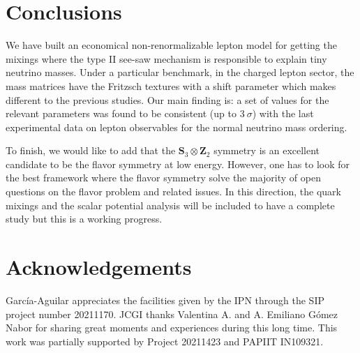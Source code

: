 \documentclass[aps,prd,groupaddress,floatfix,tighten,nofootinbib,showpacs,amsfonts,superscriptaddress]{revtex4-2}
\begin{document}
\section{Conclusions}


We have built an economical non-renormalizable lepton model for getting the mixings where the type II see-saw mechanism is responsible to explain tiny neutrino masses. Under a particular benchmark, in the charged lepton sector, the mass matrices have the Fritzsch textures with a shift parameter which makes different to the previous studies.
Our main finding is: a set of values for the relevant parameters was found to be consistent (up to $3~\sigma$) with the last experimental data on
lepton observables for the normal neutrino mass ordering.




To finish, we would like to add that the $\mathbf{S}_{3}\otimes \mathbf{Z}_{2}$ symmetry is an excellent candidate to be the flavor symmetry at low energy. However, one has to look for the best framework where the flavor symmetry solve the majority of open questions on the flavor problem and related issues. In this direction, the quark mixings and the scalar potential analysis will be included to have a complete study but this is a working progress. 














\section*{Acknowledgements}
Garc\'ia-Aguilar appreciates the facilities given by the IPN through the SIP project number 20211170. JCGI thanks  Valentina A. and A. Emiliano  G\'omez Nabor for  sharing great moments and experiences during this long time. This work was partially supported by Project 20211423 and PAPIIT IN109321. 
\end{document}
